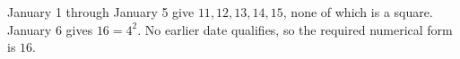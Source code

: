 January 1 through January 5 give $11,12,13,14,15$, none of which is a square. January 6 gives $16=4^2$. No earlier date qualifies, so the required numerical form is $\boxed{16}$.
